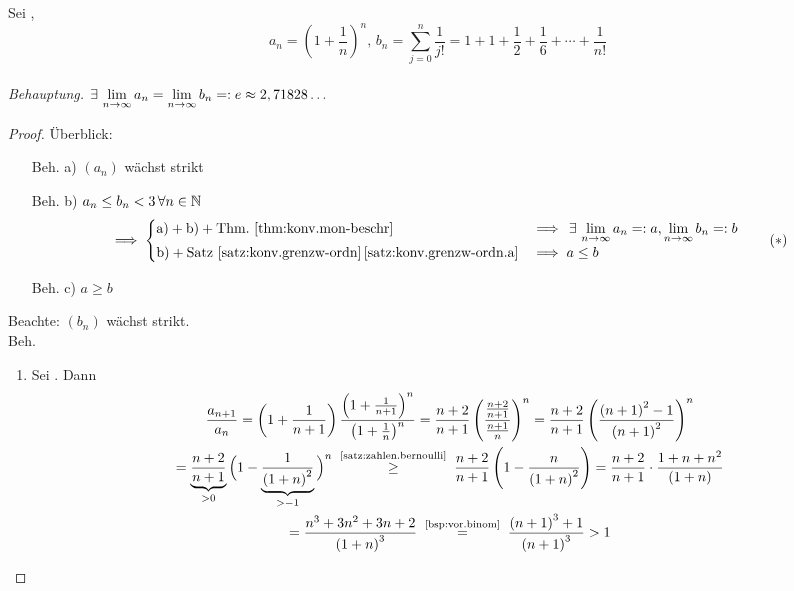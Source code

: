 \documentclass[12pt]{scrreprt}
\begin{document}
\begin{bsp}
  \label{bsp:konv.e}
  Sei , \[a_n = \left(1+\frac1n\right)^n \text{, }
  b_n=\sum_{j=0}^{n}{\frac{1}{j!}} =
  1+1+\frac12+\frac16+\dotsb+\frac{1}{n!}\]\\
  \emph{Behauptung.}
  $\exists\,\lim\limits_{n\rightarrow\infty}{a_n}=\lim\limits_{n\rightarrow\infty}{b_n}=:e\approx2,71828\dotsc$
  \begin{proof}
    Überblick:
    \begin{enumerate}
    \item[Beh. a)] $(a_n)$ wächst strikt
    \item[Beh. b)] $a_n \le b_n < 3 \,\forall n\in\mathbb{N}$
      \begin{equation} \label{eqn:konv.e.stern} \implies \begin{cases}
          \text{a)}+\text{b)}+\text{Thm.~\ref{thm:konv.mon-beschr}}
          &\implies \,\exists\,\lim\limits_{n\rightarrow\infty}{a_n}=:a,
          \lim\limits_{n\rightarrow\infty}{b_n}=:b \\ \text{b)}+\text{Satz
            \ref{satz:konv.grenzw-ordn}\,\ref{satz:konv.grenzw-ordn.a}}
          &\implies a \le b \end{cases} \tag{$*$}
      \end{equation}
    \item[Beh. c)] $a \ge b$
    \end{enumerate}
    Beachte: $(b_n)$ wächst strikt.\\\folgt Beh.
    \begin{enumerate}
    \item Sei . Dann
      \begin{gather*}
        \frac{a_{n+1}}{a_n} = \left(1+\frac{1}{n+1}\right)
        \frac{\left(1+\frac{1}{n+1}\right)^n}{\left(1+\frac1n\right)^n}
        = \frac{n+2}{n+1} \left( \frac{\frac{n+2}{n+1}}{\frac{n+1}{n}}
        \right)^n = \frac{n+2}{n+1} \left(
          \frac{\left(n+1\right)^2-1}{\left(n+1\right)^2} \right)^n
        \\= \underbrace{\frac{n+2}{n+1}}_{>0}
        \Big(1-\underbrace{\frac{1}{\left(1+n\right)^2}}_{>-1} \Big)^n
        \nach{\ge}{\ref{satz:zahlen.bernoulli}} \frac{n+2}{n+1}
        \left(1-\frac{n}{\left(1+n\right)^2} \right) = \frac{n+2}{n+1}
        \cdot \frac{1+n+n^2}{\left(1+n\right)} \\=
        \frac{n^3+3n^2+3n+2}{\left(1+n\right)^3}
        \nach{=}{\ref{bsp:vor.binom}}
        \frac{\left(n+1\right)^3+1}{\left(n+1\right)^3} > 1
      \end{gather*}

\end{enumerate}
\end{proof}
\end{bsp}
\end{document}
